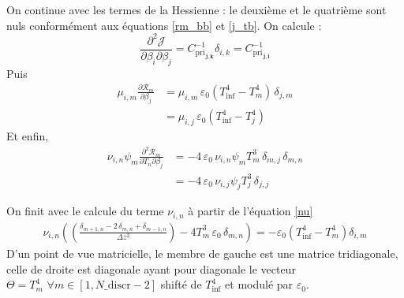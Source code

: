 \documentclass[a4paper,12pt]{article}
\newcommand{\bepar}[1]{
	\left( #1 \right)  
}
\newcommand{\parfracD}[3]{
	\frac{\partial^2 #1}{\partial #2 \partial #3}
}
\newcommand{\kro}[2]{
\delta_{#1,#2}
}
\newcommand{\epsz}{\varepsilon_0}
\newcommand{\tinf}{T^4_{\text{inf}}}
\newcommand{\CP}[2]{C^{-1}_{\text{pri}_{\, \mathbf{#1, #2}}}}
\numberwithin{equation}{section} %
\begin{document}
\noindent On continue avec les termes de la Hessienne : le deuxième et le quatrième sont nuls conformément aux équations \eqref{rm_bb} et \eqref{j_tb}. On calcule :
\begin{equation}
\parfracD{\mathcal{J}}{\beta_i}{\beta_j} = \CP{j}{k} \kro{i}{k} = \CP{j}{i}
\end{equation}
Puis 
\begin{align}
\mu_{i,m}\frac{\partial \mathcal{R}_m}{\partial \beta_j} &= \mu_{i,m}\, \epsz\bepar{\tinf - T_m^4}\, \kro{j}{m} \\
&= \mu_{i,j}\, \epsz\bepar{\tinf - T_j^4}
\end{align}
Et enfin,
\begin{align}
\nu_{i,n} \psi_m \parfracD{\mathcal{R}_m}{T_n}{\beta_j} &= -4\, \epsz\, \nu_{i,n}\psi_m T_m^3\, \kro{m}{j} \,\kro{m}{n} \\
&= -4\, \epsz\, \nu_{i,j}\psi_j T^3_j\, \kro{j}{j}
\end{align}

\noindent On finit avec le calcule du terme $\nu_{i,n}$ à partir de l'équation \eqref{nu}
\begin{align}
\nu_{i,n} \bepar{ \bepar{\frac{\kro{m+1}{n} - 2\, \kro{m}{n} + \kro{m-1}{n}}{\Delta z^2}} -4T_m^3\, \epsz\, \kro{m}{n}} = -\epsz\bepar{\tinf-T_m^4}\kro{i}{m}
\end{align}
D'un point de vue matricielle, le membre de gauche est une matrice tridiagonale, celle de droite est diagonale ayant pour diagonale le vecteur $\Theta = T_m^4  \,\, \forall m \in \left[1, N\_{\text{discr} -2} \right]$ shifté de $\tinf$ et modulé par $\epsz$.
\end{document}
